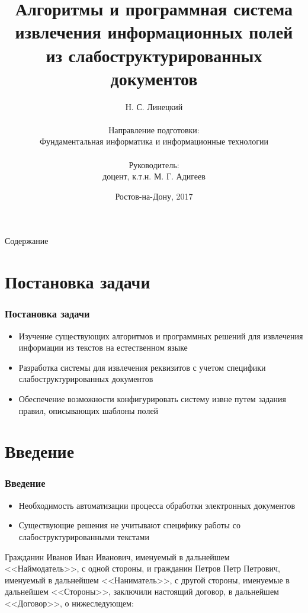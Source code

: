 \documentclass[10pt]{beamer}
\begin{document}
\title[Алгоритмы извлечения полей]{Алгоритмы и программная система извлечения информационных полей из слабоструктурированных документов}
\author{Н. С. Линецкий\\
\ \\
Направление подготовки:\\
Фундаментальная информатика и информационные технологии\\
\ \\
Руководитель:\\
доцент, к.т.н. М. Г. Адигеев}
\date{Ростов-на-Дону, 2017} 

{
	\begin{frame}
		\titlepage
	\end{frame}
}

\begin{frame}{Содержание}
\tableofcontents
\end{frame}

\section{Постановка задачи}
\begin{frame}
\frametitle{Постановка задачи}
\begin{itemize}
	\item Изучение существующих алгоритмов и программных решений для извлечения информации из текстов на естественном языке
	\item Разработка системы для извлечения реквизитов с учетом специфики слабоструктурированных документов
	\item Обеспечение возможности конфигурировать систему извне путем задания правил, описывающих шаблоны полей
\end{itemize}
\end{frame}

\section{Введение}
\begin{frame}
\frametitle{Введение}
\begin{itemize}
	\item Необходимость автоматизации процесса обработки электронных документов
	\item Существующие решения не учитывают специфику работы со слабоструктурированными текстами
\end{itemize}
\begin{example}
Гражданин Иванов Иван Иванович, именуемый в дальнейшем <<Наймодатель>>, с одной стороны, и гражданин Петров Петр Петрович, именуемый в дальнейшем <<Наниматель>>, с другой стороны, именуемые в дальнейшем <<Стороны>>, заключили настоящий договор, в дальнейшем <<Договор>>, о нижеследующем:
\end{example}
\end{frame}
\end{document}
